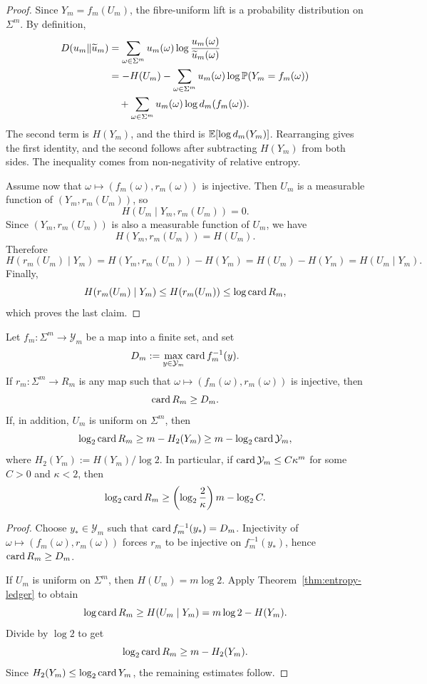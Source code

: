 \begin{proof}
Since \(Y_m=f_m(U_m)\), the fibre-uniform lift is a probability
distribution on \(\Sigma^m\).  By definition,
\begin{align*}
  D(u_m\Vert \widetilde u_m)
  &= \sum_{\omega\in\Sigma^m}
      u_m(\omega)\log\frac{u_m(\omega)}{\widetilde u_m(\omega)} \\
  &= -H(U_m)
     - \sum_{\omega\in\Sigma^m}
        u_m(\omega)\log \mathbb{P}(Y_m=f_m(\omega)) \\
  &\quad
     + \sum_{\omega\in\Sigma^m}
        u_m(\omega)\log d_m(f_m(\omega)).
\end{align*}
The second term is \(H(Y_m)\), and the third is
\(\mathbb{E}[\log d_m(Y_m)]\).  Rearranging gives the first identity, and the
second follows after subtracting \(H(Y_m)\) from both sides.  The
inequality comes from non-negativity of relative entropy.

Assume now that \(\omega\mapsto(f_m(\omega),r_m(\omega))\) is injective.
Then \(U_m\) is a measurable function of \((Y_m,r_m(U_m))\), so
\[
  H(U_m\mid Y_m,r_m(U_m))=0.
\]
Since \((Y_m,r_m(U_m))\) is also a measurable function of \(U_m\), we
have
\[
  H(Y_m,r_m(U_m))=H(U_m).
\]
Therefore
\[
  H(r_m(U_m)\mid Y_m)
  = H(Y_m,r_m(U_m))-H(Y_m)
  = H(U_m)-H(Y_m)
  = H(U_m\mid Y_m).
\]
Finally,
\[
  H(r_m(U_m)\mid Y_m)\leq H(r_m(U_m))\leq \log\operatorname{card}{R_m},
\]
which proves the last claim.
\end{proof}

\begin{corollary}
\label{thm:register-lower-bound}
Let \(f_m:\Sigma^m\to \mathcal{Y}_m\) be a map into a finite set, and set
\[
  D_m:=\max_{y\in \mathcal{Y}_m}\operatorname{card}{f_m^{-1}(y)}.
\]
If \(r_m:\Sigma^m\to R_m\) is any map such that
\(\omega\mapsto(f_m(\omega),r_m(\omega))\) is injective, then
\[
  \operatorname{card}{R_m}\geq D_m.
\]
If, in addition, \(U_m\) is uniform on \(\Sigma^m\), then
\[
  \log_2\operatorname{card}{R_m}
  \geq m-H_2(Y_m)\geq m-\log_2\operatorname{card}{\mathcal{Y}_m},
\]
where \(H_2(Y_m):=H(Y_m)/\log 2\).  In particular, if
\(\operatorname{card}{\mathcal{Y}_m}\leq C\kappa^m\) for some \(C>0\) and \(\kappa<2\), then
\[
  \log_2\operatorname{card}{R_m}
  \geq \left(\log_2\frac{2}{\kappa}\right)m-\log_2 C.
\]
\end{corollary}

\begin{proof}
Choose \(y_\ast\in \mathcal{Y}_m\) such that
\(\operatorname{card}{f_m^{-1}(y_\ast)}=D_m\).  Injectivity of
\(\omega\mapsto(f_m(\omega),r_m(\omega))\) forces \(r_m\) to be
injective on \(f_m^{-1}(y_\ast)\), hence \(\operatorname{card}{R_m}\geq D_m\).

If \(U_m\) is uniform on \(\Sigma^m\), then \(H(U_m)=m\log 2\).  Apply
Theorem~\ref{thm:entropy-ledger} to obtain
\[
  \log\operatorname{card}{R_m}\geq H(U_m\mid Y_m)=m\log 2-H(Y_m).
\]
Divide by \(\log 2\) to get
\[
  \log_2\operatorname{card}{R_m}\geq m-H_2(Y_m).
\]
Since \(H_2(Y_m)\leq \log_2\operatorname{card}{Y_m}\), the remaining estimates follow.
\end{proof}

